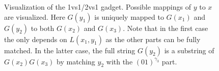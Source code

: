 \begin{figure}
	\caption{Visualization of the 1vs1/2vs1 gadget. Possible mappings of $y$ to $x$ are visualized. Here $G(y_1)$ is uniquely mapped to $G(x_1)$ and $G(y_2)$ to both $G(x_2)$ and $G(x_3)$. Note that in the first case the \lcs{} only depends on $L(x_1, y_1)$ as the other parts can be fully matched. In the latter case, the full string $G(y_2)$ is a substring of $G(x_2)G(x_3)$ by matching $y_2$ with the $(01)^{\gamma_3}$ part.}
	\label{fig:12vs1gadget}
\end{figure}

